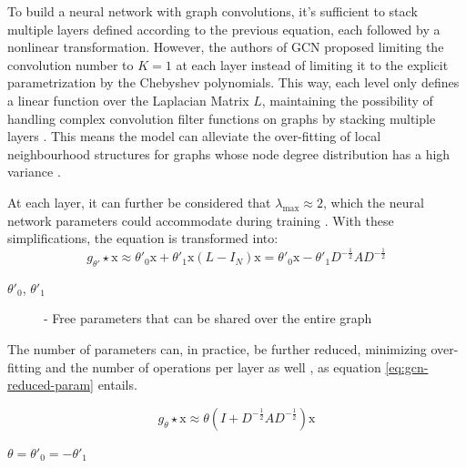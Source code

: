 To build a neural network with graph convolutions, it's sufficient to stack multiple layers defined according to the previous equation, each followed by a nonlinear transformation. However, the authors of \ac{GCN} \cite{kipfSemiSupervisedClassificationGraph2017} proposed limiting the convolution number to $K = 1$ at each layer instead of limiting it to the explicit parametrization by the Chebyshev polynomials. This way, each level only defines a linear function over the Laplacian Matrix $L$, maintaining the possibility of handling complex convolution filter functions on graphs by stacking multiple layers \cite{kipfSemiSupervisedClassificationGraph2017, tangGraphNeuralNetworks2022}. This means the model can alleviate the over-fitting of local neighbourhood structures for graphs whose node degree distribution has a high variance \cite{kipfSemiSupervisedClassificationGraph2017, tangGraphNeuralNetworks2022}.

At each layer, it can further be considered that $\lambda_\text{max} \approx 2$, which the neural network parameters could accommodate during training \cite{tangGraphNeuralNetworks2022}. With these simplifications, the equation is transformed into:
\begin{equation}
	g_{\theta'} \star \text{x} \approx \theta'_0 \text{x} + \theta'_1 \text{x} (L - I_N) \text{x} = \theta'_0 \text{x} - \theta'_1 D^{-\frac{1}{2}} AD^{-\frac{1}{2}}
\end{equation}

\begin{description}
	\item[$\theta'_0$, $\theta'_1$] - Free parameters that can be shared over the entire graph
\end{description}
	


The number of parameters can, in practice, be further reduced, minimizing over-fitting and the number of operations per layer as well \cite{tangGraphNeuralNetworks2022}, as equation \ref{eq:gcn-reduced-param} entails.

\begin{equation} \label{eq:gcn-reduced-param}
	g_\theta \star \text{x} \approx \theta (I + D^{-\frac{1}{2}} AD^{-\frac{1}{2}}) \text{x}
\end{equation}

\begin{description}
	\item[$\theta = \theta'_0 = - \theta'_1$]
\end{description}


